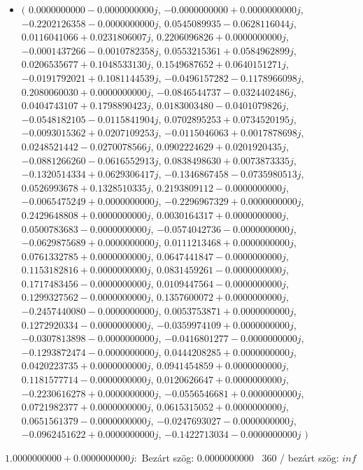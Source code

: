 \documentclass[14pt,a4paper]{article}
\begin{document}
\begin{itemize}
\item
$\big($
$0.0000000000-0.0000000000j$, $-0.0000000000+0.0000000000j$, $-0.2202126358-0.0000000000j$, $0.0545089935-0.0628116044j$, $0.0116041066+0.0231806007j$, $0.2206096826+0.0000000000j$, $-0.0001437266-0.0010782358j$, $0.0553215361+0.0584962899j$, $0.0206535677+0.1048533130j$, $0.1549687652+0.0640151271j$, $-0.0191792021+0.1081144539j$, $-0.0496157282-0.1178966098j$, $0.2080060030+0.0000000000j$, $-0.0846544737-0.0324402486j$, $0.0404743107+0.1798890423j$, $0.0183003480-0.0401079826j$, $-0.0548182105-0.0115841904j$, $0.0702895253+0.0734520195j$, $-0.0093015362+0.0207109253j$, $-0.0115046063+0.0017878698j$, $0.0248521442-0.0270078566j$, $0.0902224629+0.0201920435j$, $-0.0881266260-0.0616552913j$, $0.0838498630+0.0073873335j$, $-0.1320514334+0.0629306417j$, $-0.1346867458-0.0735980513j$, $0.0526993678+0.1328510335j$, $0.2193809112-0.0000000000j$, $-0.0065475249+0.0000000000j$, $-0.2296967329+0.0000000000j$, $0.2429648808+0.0000000000j$, $0.0030164317+0.0000000000j$, $0.0500783683-0.0000000000j$, $-0.0574042736-0.0000000000j$, $-0.0629875689+0.0000000000j$, $0.0111213468+0.0000000000j$, $0.0761332785+0.0000000000j$, $0.0647441847-0.0000000000j$, $0.1153182816+0.0000000000j$, $0.0831459261-0.0000000000j$, $0.1717483456-0.0000000000j$, $0.0109447564-0.0000000000j$, $0.1299327562-0.0000000000j$, $0.1357600072+0.0000000000j$, $-0.2457440080-0.0000000000j$, $0.0053753871+0.0000000000j$, $0.1272920334-0.0000000000j$, $-0.0359974109+0.0000000000j$, $-0.0307813898-0.0000000000j$, $-0.0416801277-0.0000000000j$, $-0.1293872474-0.0000000000j$, $0.0444208285+0.0000000000j$, $0.0420223735+0.0000000000j$, $0.0941454859+0.0000000000j$, $0.1181577714-0.0000000000j$, $0.0120626647+0.0000000000j$, $-0.2230616278+0.0000000000j$, $-0.0556546681+0.0000000000j$, $0.0721982377+0.0000000000j$, $0.0615315052+0.0000000000j$, $0.0651561379-0.0000000000j$, $-0.0247693027-0.0000000000j$, $-0.0962451622+0.0000000000j$, $-0.1422713034-0.0000000000j$
$\big)$
\end{itemize}
$1.0000000000+0.0000000000j$:\
Bezárt szög: $0.0000000000$ \
360 / bezárt szög: $inf$\
\end{document}
